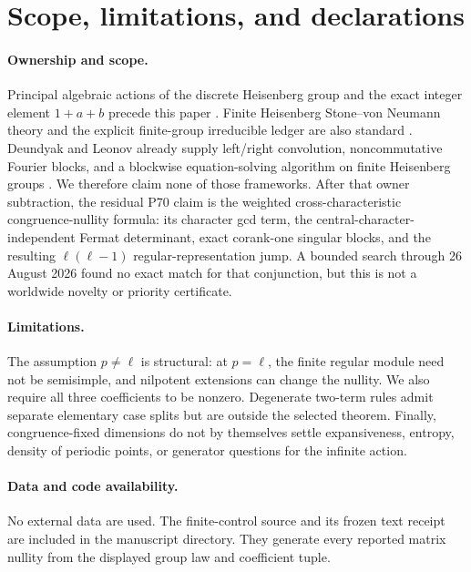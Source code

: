 \section{Scope, limitations, and declarations}

\paragraph{Ownership and scope.}
Principal algebraic actions of the discrete Heisenberg group and the exact
integer element $1+a+b$ precede this paper
\citep{GollSchmidtVerbitskiy2014,LindSchmidt2015}.  Finite Heisenberg
Stone--von Neumann theory and the explicit finite-group irreducible ledger are
also standard \citep{GurevichHadani2010,GrassbergerHormann2001}.  Deundyak and
Leonov already supply left/right convolution, noncommutative Fourier blocks,
and a blockwise equation-solving algorithm on finite Heisenberg groups
\citep{DeundyakLeonov2016}.  We therefore claim none of those frameworks.
After that owner subtraction, the residual P70 claim is the weighted
cross-characteristic congruence-nullity formula: its character gcd term, the
central-character-independent Fermat determinant, exact corank-one singular
blocks, and the resulting $\ell(\ell-1)$ regular-representation jump.  A
bounded search through 26 August 2026 found no exact match for that conjunction,
but this is not a worldwide novelty or priority certificate.

\paragraph{Limitations.}
The assumption $p\ne\ell$ is structural: at $p=\ell$, the finite regular
module need not be semisimple, and nilpotent extensions can change the
nullity.  We also require all three coefficients to be nonzero.  Degenerate
two-term rules admit separate elementary case splits but are outside the
selected theorem.  Finally, congruence-fixed dimensions do not by themselves
settle expansiveness, entropy, density of periodic points, or generator
questions for the infinite action.

\paragraph{Data and code availability.}
No external data are used.  The finite-control source and its frozen text
receipt are included in the manuscript directory.  They generate every
reported matrix nullity from the displayed group law and coefficient tuple.

